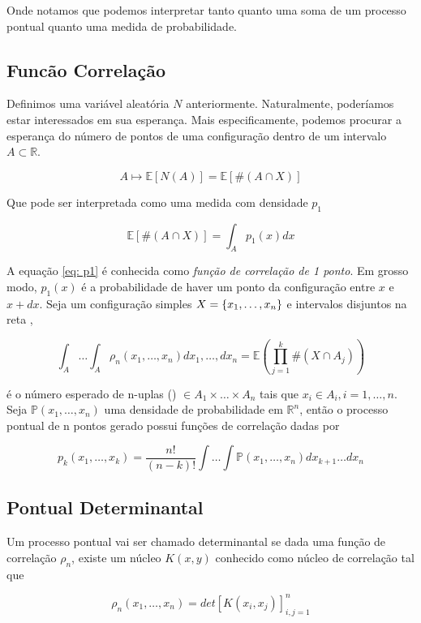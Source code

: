 Onde notamos que podemos interpretar tanto quanto uma soma de um processo pontual quanto uma medida de probabilidade.


\subsection{Funcão Correlação}

Definimos uma variável aleatória $N$ anteriormente. Naturalmente, poderíamos estar interessados em sua esperança. Mais especificamente, podemos procurar a esperança do número de pontos de uma configuração dentro de um intervalo $A \subset \mathbb{R}$.

\[
	A \mapsto \mathbb{E}[N(A)] = \mathbb{E}[\#(A \cap X)]	
\]

Que pode ser interpretada como uma medida com densidade $p_1$

\begin{equation}
	\mathbb{E}[\#(A \cap X)] = \int_{A} p_1(x) dx
	\label{eq: p1}
\end{equation}

A equação \ref{eq: p1} é conhecida como \textit{função de correlação de 1 ponto}. Em grosso modo, $p_1(x)$ é a probabilidade de haver um ponto da configuração entre $x$ e $x+dx$. Seja um configuração simples $X = \{x_1, \dots, x_n\}$ e intervalos disjuntos na reta ,

\[
	\int_A \dots \int_A \rho_n(x_1, \dots, x_n) dx_1, \dots, dx_n = \mathbb{E} \left( \prod_{j=1}^{k} \# (X \cap A_j) \right) 
\]

é o número esperado de n-uplas () $\in A_1 \times \dots \times A_n$ tais que $x_i \in A_i, i=1,\dots,n$. Seja $\mathbb{P}(x_1, \dots, x_n)$ uma densidade de probabilidade em $\mathbb{R}^n$, então o processo pontual de n pontos gerado possui funções de correlação dadas por

\[
	p_k(x_1, \dots, x_k) = \frac{n!}{(n-k)!} \int \dots \int \mathbb{P}(x_1, \dots, x_n) dx_{k+1}\dots dx_n
\]


\subsection{Pontual Determinantal}

Um processo pontual vai ser chamado determinantal se dada uma função de correlação $\rho_n$, existe um núcleo $K(x, y)$ conhecido como núcleo de correlação tal que

\begin{equation}
	\rho_n(x_1, \dots, x_n) = det[K(x_i, x_j)]_{i,j=1}^{n}
	\label{eq: pontualdet}
\end{equation}

